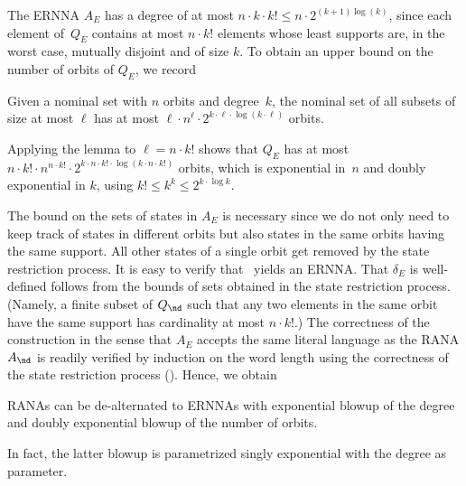 \documentclass[10pt, final, conference, a4paper, twocolumn]{IEEEtran}
\begin{document}
\noindent The ERNNA $A_E$ has a degree of at most $n \cdot k \cdot k! \leqslant
n \cdot 2^{(k + 1)\log(k)}$, since each element of~$Q_E$ contains at
most $n \cdot k!$ elements whose least supports are, in the worst
case, mutually disjoint and of size $k$.
To obtain an upper bound on the number of orbits of $Q_E$, we record %
\begin{lem}\label{L:Bell}
  Given a nominal set with $n$ orbits and degree~$k$, the nominal set of all subsets of size at most $\ell$ has at most $\ell \cdot n^\ell \cdot 2^{k\cdot \ell \cdot \log(k \cdot\ell)}$ orbits.
\end{lem}

Applying the lemma to $\ell = n \cdot k!$ shows that $Q_E$ has at most
$
  n \cdot k! \cdot  n^{n \cdot k!} \cdot 2^{k \cdot n \cdot k! \cdot\log(k \cdot n \cdot k!)}$ orbits, which is exponential in~$n$ and doubly exponential in $k$, using $k! \leqslant k^k \leqslant 2^{k\cdot \log k}$.

  The bound on the sets of states in $A_E$ is necessary since we do not only need to keep track
  of states in different orbits but also states in the same orbits having the same support.
  All other states of a single orbit get removed by the state restriction process.  It is easy
  to verify that~ yields an ERNNA.  That $\delta_E$ is well-defined follows
  from the bounds of sets obtained in the state restriction process.  (Namely, a finite subset
  of $Q_{\nd}$ such that any two elements in the same orbit have the same support has
  cardinality at most $n\cdot k!$.)  The correctness of the construction in the sense that
  $A_E$ accepts the same literal language as the RANA $A_{\nd}$ is readily verified by
  induction on the word length using the correctness of the state restriction process
  (). Hence, we obtain


\begin{theo}\label{thm:corrdealt}
  RANAs can be de-alternated to ERNNAs with exponential blowup of the degree
  and doubly exponential blowup of the number of orbits.
\end{theo}

\noindent In fact, the latter blowup is parametrized singly exponential with the
degree as parameter.
\end{document}
